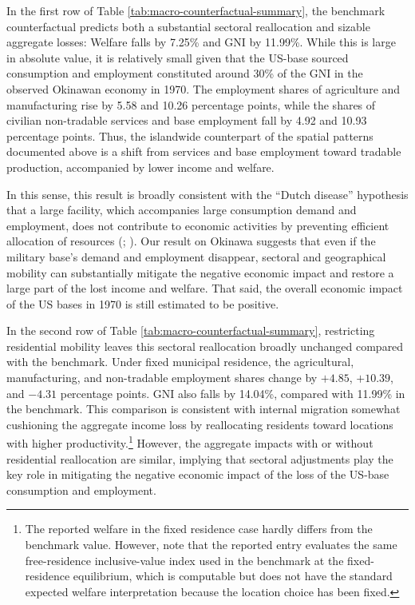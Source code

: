 \documentclass[12pt, unicode, a4paper]{article}
\newcommand{\1}{\mbox{1}\hspace{-0.25em}\mbox{l}} %
\begin{document}
In the first row of Table \ref{tab:macro-counterfactual-summary}, the benchmark counterfactual predicts both a substantial sectoral reallocation and sizable aggregate losses: Welfare falls by 7.25\% and GNI by 11.99\%. 
While this is large in absolute value, it is relatively small given that the US-base sourced consumption and employment constituted around 30\% of the GNI in the observed Okinawan economy in 1970.
The employment shares of agriculture and manufacturing rise by 5.58 and 10.26 percentage points, while the shares of civilian non-tradable services and base employment fall by 4.92 and 10.93 percentage points. Thus, the islandwide counterpart of the spatial patterns documented above is a shift from services and base employment toward tradable production, accompanied by lower income and welfare.

In this sense, this result is broadly consistent with the ``Dutch disease'' hypothesis that a large facility, which accompanies large consumption demand and employment, does not contribute to economic activities by preventing efficient allocation of resources  (\citealt{gollin2016urbanization}; \citealt{allcott2018dutch}). Our result on Okinawa suggests that even if the military base's demand and employment disappear, sectoral and geographical mobility can substantially mitigate the negative economic impact and restore a large part of the lost income and welfare. That said, the overall economic impact of the US bases in 1970 is still estimated to be positive.

In the second row of Table \ref{tab:macro-counterfactual-summary}, restricting residential mobility leaves this sectoral reallocation broadly unchanged compared with the benchmark. Under fixed municipal residence, the agricultural, manufacturing, and non-tradable employment shares change by $+4.85$, $+10.39$, and $-4.31$ percentage points. GNI also falls by 14.04\%, compared with 11.99\% in the benchmark. This comparison is consistent with internal migration somewhat cushioning the aggregate income loss by reallocating residents toward locations with higher productivity.\footnote{The reported welfare in the fixed residence case hardly differs from the benchmark value. However, note that the reported entry evaluates the same free-residence inclusive-value index used in the benchmark at the fixed-residence equilibrium, which is computable but does not have the standard expected welfare interpretation because the location choice has been fixed.}
However, the aggregate impacts with or without residential reallocation are similar, implying that sectoral adjustments play the key role in mitigating the negative economic impact of the loss of the US-base consumption and employment. 
\end{document}

